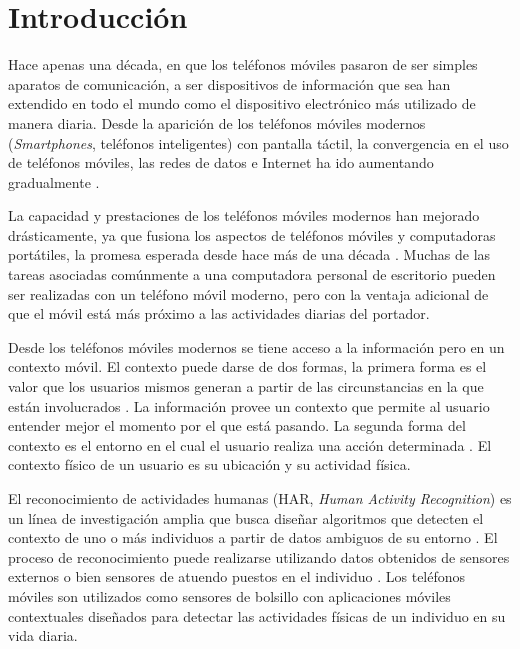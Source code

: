 
\chapter{Introducción}

\label{introduccion}

Hace apenas una década, en que los teléfonos móviles pasaron de ser
simples aparatos de comunicación, a ser dispositivos de información
que sea han extendido en todo el mundo como el dispositivo electrónico
más utilizado de manera diaria. Desde la aparición de los teléfonos
móviles modernos (\emph{Smartphones}, teléfonos inteligentes) con
pantalla táctil, la convergencia en el uso de teléfonos móviles, las
redes de datos e Internet ha ido aumentando gradualmente \cite{fling2009mobile}.

La capacidad y prestaciones de los teléfonos móviles modernos han
mejorado drásticamente, ya que fusiona los aspectos de teléfonos móviles
y computadoras portátiles, la promesa esperada desde hace más de una
década \cite{Tanenbaum2010}. Muchas de las tareas asociadas comúnmente
a una computadora personal de escritorio pueden ser realizadas con
un teléfono móvil moderno, pero con la ventaja adicional de que el
móvil está más próximo a las actividades diarias del portador.

Desde los teléfonos móviles modernos se tiene acceso a la información
pero en un contexto móvil. El contexto puede darse de dos formas,
la primera forma es el valor que los usuarios mismos generan a partir
de las circunstancias en la que están involucrados \cite{fling2009mobile}.
La información provee un contexto que permite al usuario entender
mejor el momento por el que está pasando. La segunda forma del contexto
es el entorno en el cual el usuario realiza una acción determinada
\cite{fling2009mobile}. El contexto físico de un usuario es su ubicación
y su actividad física. 

El reconocimiento de actividades humanas (HAR,
\emph{Human Activity Recognition}) es un línea de investigación amplia
que busca diseñar algoritmos que detecten el contexto de uno o más
individuos a partir de datos ambiguos de su entorno \cite{Bao2004}.
El proceso de reconocimiento puede realizarse utilizando datos obtenidos
de sensores externos o bien sensores de atuendo puestos en el individuo
\cite{LaraLabrador2013}. Los teléfonos móviles son utilizados como
sensores de bolsillo con aplicaciones móviles contextuales diseñados
para detectar las actividades físicas de un individuo en su vida diaria. 

